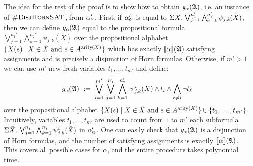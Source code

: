 The idea for the rest of the proof is to show how to obtain $g_{\alpha}(\mathfrak{A})$, i.e. an instance of $\textsc{\#DisjHornSAT}$, from $\alpha_{\mathfrak{A}}'$.
First, if $\alpha_{\mathfrak{A}}'$ is equal to $\Sigma{\bar{X}}.\,\bigvee_{j = 1}^{n_1'}\bigwedge_{k = 1}^{n_2'}\psi_{j,k}(\bar{X})$, then we can define $g_{\alpha}(\mathfrak{A})$ equal to the propositional formula $\bigvee_{j = 1}^{n_1'}\bigwedge_{k = 1}^{n_2'}\psi_{j,k}(\bar{X})$ over the propositional alphabet $\{X(\bar{e}) \mid X \in \bar{X} \text{ and } \bar{e}\in A^{{\rm arity}(X)} \}$ which has exactly ${\llbracket{}{\alpha}\rrbracket}(\mathfrak{A})$ satisfying assignments and is precisely a disjunction of Horn formulas.
Otherwise, if $m' > 1$ we can use $m'$ new fresh variables $t_1,\ldots,t_{m'}$ and define:
$$
g_{\alpha}(\A) \ := \ \bigvee_{i=1}^{m'} \, \bigvee_{j = 1}^{n_1'} \, \bigwedge_{k = 1}^{n_2'} \, \psi^i_{j,k}(\bar{X}) \wedge t_i \wedge \bigwedge_{\ell \neq i} \neg t_{\ell}
$$ 
over the propositional alphabet $\{X(\bar{e}) \mid X \in \bar{X} \text{ and } \bar{e}\in A^{{\rm arity}(X)} \} \cup \{t_1,\ldots,t_{m'}\}$.
Intuitively, variables $t_1,\ldots,t_{m'}$ are used to count from $1$ to $m'$ each subformula $\Sigma{\bar{X}}.\,\bigvee_{j = 1}^{n_1'}\bigwedge_{k = 1}^{n_2'}\psi^{i}_{j,k}(\bar{X})$ in $\alpha_{\mathfrak{A}}'$.
One can easily check that $g_{\alpha}(\mathfrak{A})$ is a disjunction of Horn formulas, and the number of satisfying assignments is exactly ${\llbracket{}{\alpha}\rrbracket}(\mathfrak{A})$. This covers all possible cases for $\alpha$, and the entire procedure takes polynomial time.
